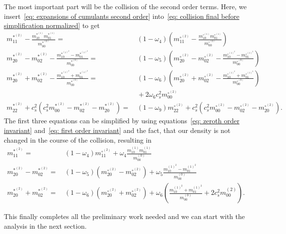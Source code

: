 The most important part will be the collision of the second order terms.
Here, we insert~\eqref{eq: expansions of cumulants second order} into~\eqref{eq: collision final before simplification normalized} to get
\begin{align*}
  m_{11}^{*^{(2)}} - \frac{ m_{10}^{*^{(1)}}m_{01}^{*^{(1)}}}{m_{00}^{*^{(0)}}} =&\ (1-\omega_4)\left(m_{11}^{\circ^{(2)}} - \frac{ m_{10}^{\circ^{(1)}}m_{01}^{\circ^{(1)}}}{m_{00}^{\circ^{(0)}}}\right)
  \\
  m_{20}^{*^{(2)}}-m_{02}^{*^{(2)}} - \frac{ m_{10}^{*^{{(1)}^2}} - m_{01}^{*^{{(1)}^2}}}{m_{00}^{*^{(0)}}} =&\ (1-\omega_5) \left(m_{20}^{\circ^{(2)}}-m_{02}^{\circ^{(2)}} - \frac{ m_{10}^{\circ^{{(1)}^2}} - m_{01}^{\circ^{{(1)}^2}}}{m_{00}^{\circ^{(0)}}}\right)
  \\
  m_{20}^{*^{(2)}}+m_{02}^{*^{(2)}} - \frac{ m_{10}^{*^{{(1)}^2}} + m_{01}^{*^{{(1)}^2}}}{m_{00}^{*^{(0)}}}
  =&\ (1-\omega_6)\left(  m_{20}^{\circ^{(2)}}+m_{02}^{\circ^{(2)}} - \frac{ m_{10}^{\circ^{{(1)}^2}} + m_{01}^{\circ^{{(1)}^2}}}{m_{00}^{\circ^{(0)}}}\right)
  \\\nonumber&\ + 2\omega_6 c_s^2 m_{00}^{\circ^{(2)}}
  \\
  m_{22}^{*^{(2)}}
  + c_s^2\left(c_s^2 m_{00}^{*^{(2)}}
  - m_{02}^{*^{(2)}}
  - m_{20}^{*^{(2)}} \right)
  =&\ (1-\omega_9)m_{22}^{\circ^{(2)}}
  + c_s^2\left(c_s^2 m_{00}^{\circ^{(2)}}
  - m_{02}^{\circ^{(2)}}
  - m_{20}^{\circ^{(2)}}    \right).
\end{align*}
The first three equations can be simplified by using equations~\eqref{eq: zeroth order invariant} and~\eqref{eq: first order invariant} and the fact, that our density is not changed in the course of the collision, resulting in
\begin{align}
  \label{eq: collide moments 11_2}
  m_{11}^{*^{(2)}}  =&\ (1-\omega_4)m_{11}^{\circ^{(2)}} + \omega_4 \frac{ m_{10}^{(1)}m_{01}^{(1)}}{m_{00}^{(0)}}
  \\
  \label{eq: collide moments 20m02_2}
  m_{20}^{*^{(2)}}-m_{02}^{*^{(2)}} =&\ (1-\omega_5) \left(m_{20}^{\circ^{(2)}}-m_{02}^{\circ^{(2)}}\right) + \omega_5 \frac{ m_{10}^{{(1)}^2} - m_{01}^{{(1)}^2}}{m_{00}^{(0)}}
  \\
  \label{eq: collide moments 20p02_2}
  m_{20}^{*^{(2)}}+m_{02}^{*^{(2)}}
  =&\ (1-\omega_6)\left(  m_{20}^{\circ^{(2)}} + m_{02}^{\circ^{(2)}}\right)
  + \omega_6 \left( \frac{ m_{10}^{{(1)}^2} + m_{01}^{{(1)}^2}}{m_{00}^{(0)}}
  + 2 c_s^2 m_{00}^{(2)} \right).
\end{align}


This finally completes all the preliminary work needed and we can start with the analysis in the next section.
